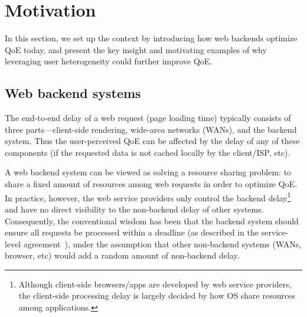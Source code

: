 
\section{Motivation}
In this section, we set up the context by introducing how web backends optimize QoE today, and present the key insight and motivating examples of why leveraging user heterogeneity could further improve QoE.

\subsection{Web backend systems}
The end-to-end delay of a web request (\ie page loading time) typically consists of three parts---client-side rendering, wide-area networks (WANs), and the backend system.
Thus the user-perceived QoE can be affected by the delay of any of these components
(if the requested data is not cached locally by the client/ISP, etc). 

A web backend system can be viewed as solving a resource sharing problem: to share a fixed amount of resources among web requests in order to optimize QoE.
In practice, however, the web service providers only control the backend delay\footnote{Although client-side browsers/apps are developed by web service providers, the client-side processing delay is largely decided by how OS share resources among applications.} and have no direct visibility to the non-backend delay of other systems. 
Consequently, the conventional wisdom has been that the backend system should ensure all requests be processed within a deadline (\eg as described in the service-level agreement~\cite{jang2015silo,serrano2013towards}), under the assumption that other non-backend systems (WANs, browser, etc) would add a random amount of non-backend delay.

